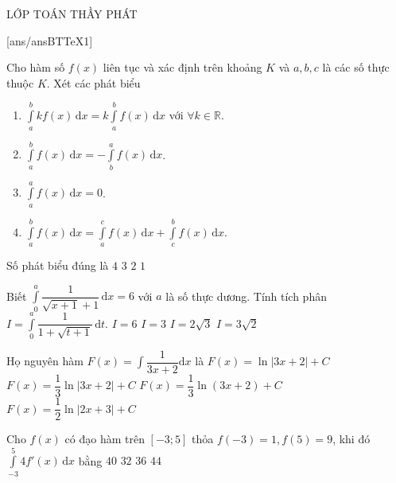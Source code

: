 \begin{name}
	{\tenchude}
	{\tendethi}
	{LỚP TOÁN THẦY PHÁT}
	{\thoigian}
\end{name}
[ans/ansBTTeX1]
\begin{ex}%
Cho hàm số $f(x)$ liên tục và xác định trên khoảng $K$ và $a, b, c$ là các số thực thuộc $K$. Xét các phát biểu
\begin{enumerate}[1)]
\item $\displaystyle\int\limits_{a}^{b}k f(x)\mathrm{\, d}x=k\displaystyle\int\limits_{a}^{b}f(x)\mathrm{\, d}x$ với $\forall k\in \mathbb{R}$.
\item $\displaystyle\int\limits_{a}^{b}f(x)\mathrm{\, d}x=-\displaystyle\int\limits_{b}^{a}f(x)\mathrm{\, d}x$.
\item $\displaystyle\int\limits_{a}^{a}f(x)\mathrm{\, d}x=0$.
\item $\displaystyle\int\limits_{a}^{b}f(x)\mathrm{\, d}x=\displaystyle\int\limits_{a}^{c}f(x)\mathrm{\, d}x+\displaystyle\int\limits_{c}^{b}f(x)\mathrm{\, d}x$.
\end{enumerate}
Số phát biểu đúng là
\choice
{\True $4$}
{$3$}
{$2$}
{$1$}
\end{ex}

\begin{ex}%
Biết $\displaystyle\int\limits_{0}^{a}\dfrac{1}{\sqrt{x+1}+1}\mathrm{\, d}x=6$ với $a$ là số thực dương. Tính tích phân $I=\displaystyle\int\limits_{0}^{a}\dfrac{1}{1+\sqrt{t+1}}\mathrm{\, d}t$.
\choice
{\True $I=6$}
{$I=3$}
{$I=2\sqrt{3}$}
{$I=3\sqrt{2}$}
\end{ex}

\begin{ex}%
Họ nguyên hàm $F(x)=\displaystyle\int\dfrac{1}{3x+2}\mathrm{d}x$ là
\choice
{$F(x)=\ln |3x+2|+C$}
{\True $F(x)=\dfrac{1}{3}\ln |3x+2|+C$}
{$F(x)=\dfrac{1}{3}\ln (3x+2)+C$}
{$F(x)=\dfrac{1}{2}\ln |2x+3|+C$}
\end{ex}

\begin{ex}%
Cho $f(x)$ có đạo hàm trên $[-3; 5]$ thỏa $f(-3)=1, f(5)=9$, khi đó $\displaystyle\int\limits_{-3}^5 4 f'(x)\mathrm{\,d}x$ bằng
\choice
{$40$}
{\True $32$}
{$36$}
{$44$}
\end{ex}

